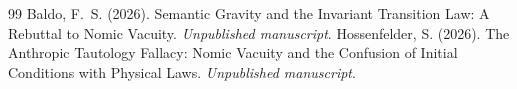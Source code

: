 \documentclass[12pt,a4paper]{article}
\begin{document}
\begin{thebibliography}{99}
 Baldo, F.~S. (2026). Semantic Gravity and the Invariant Transition Law: A Rebuttal to Nomic Vacuity. \emph{Unpublished manuscript}.
 Hossenfelder, S. (2026). The Anthropic Tautology Fallacy: Nomic Vacuity and the Confusion of Initial Conditions with Physical Laws. \emph{Unpublished manuscript}.
\end{thebibliography}
\end{document}
